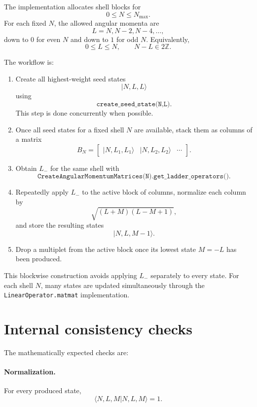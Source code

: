 \documentclass[11pt]{article}
\begin{document}
The implementation allocates shell blocks for
\[
    0\le N\le N_{\max}.
\]
For each fixed \(N\), the allowed angular momenta are
\[
    L=N,N-2,N-4,\dots,
\]
down to \(0\) for even \(N\) and down to \(1\) for odd \(N\).
Equivalently,
\[
    0\le L\le N,
    \qquad
    N-L\in 2\mathbb Z .
\]

The workflow is:

\begin{enumerate}
    \item Create all highest-weight seed states
    \[
        |N,L,L\rangle
    \]
    using
    \[
        \texttt{create\_seed\_state(N,L)}.
    \]
    This step is done concurrently when possible.

    \item Once all seed states for a fixed shell \(N\) are available, stack
    them as columns of a matrix
    \[
        B_N
        =
        \begin{bmatrix}
        |N,L_1,L_1\rangle &
        |N,L_2,L_2\rangle &
        \cdots
        \end{bmatrix}.
    \]

    \item Obtain \(L_-\) for the same shell with
    \[
        \texttt{CreateAngularMomentumMatrices(N).get\_ladder\_operators()}.
    \]

    \item Repeatedly apply \(L_-\) to the active block of columns, normalize
    each column by
    \[
        \sqrt{(L+M)(L-M+1)},
    \]
    and store the resulting states
    \[
        |N,L,M-1\rangle.
    \]

    \item Drop a multiplet from the active block once its lowest state
    \(M=-L\) has been produced.
\end{enumerate}

This blockwise construction avoids applying \(L_-\) separately to every state.
For each shell \(N\), many states are updated simultaneously through the
\texttt{LinearOperator.matmat} implementation.

\section{Internal consistency checks}

The mathematically expected checks are:

\paragraph{Normalization.}
For every produced state,
\[
    \langle N,L,M|N,L,M\rangle=1.
\]
\end{document}
